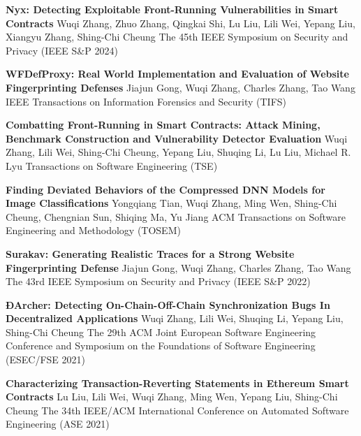 \documentclass[localFont,alternative]{documentMETADATA}
\begin{document}

\begin{keywords}
\end{keywords}


\begin{scholarship}
	{\textbf{Nyx: Detecting Exploitable Front-Running Vulnerabilities in Smart Contracts}}
	{Wuqi Zhang, Zhuo Zhang, Qingkai Shi, Lu Liu, Lili Wei, Yepang Liu, Xiangyu Zhang, Shing-Chi Cheung}
	\scholarshipentry{}
	{The 45th IEEE Symposium on Security and Privacy (IEEE S\&P 2024)}

	{\textbf{WFDefProxy: Real World Implementation and Evaluation of Website Fingerprinting Defenses}}
	{Jiajun Gong, Wuqi Zhang, Charles Zhang, Tao Wang}
	\scholarshipentry{}
	{IEEE Transactions on Information Forensics and Security (TIFS)}

	{\textbf{Combatting Front-Running in Smart Contracts: Attack Mining, Benchmark Construction and Vulnerability Detector Evaluation}}
	{Wuqi Zhang, Lili Wei, Shing-Chi Cheung, Yepang Liu, Shuqing Li, Lu Liu, Michael R. Lyu}
	\scholarshipentry{}
	{Transactions on Software Engineering (TSE)}

	{\textbf{Finding Deviated Behaviors of the Compressed DNN Models for Image Classifications}}
	{Yongqiang Tian, Wuqi Zhang, Ming Wen, Shing-Chi Cheung, Chengnian Sun, Shiqing Ma, Yu Jiang}
	\scholarshipentry{}
	{ACM Transactions on Software Engineering and Methodology (TOSEM)}

	{\textbf{Surakav: Generating Realistic Traces for a Strong Website Fingerprinting Defense}}
	{Jiajun Gong, Wuqi Zhang, Charles Zhang, Tao Wang}
	\scholarshipentry{}
	{The 43rd IEEE Symposium on Security and Privacy (IEEE S\&P 2022)}

	{\textbf{ÐArcher: Detecting On-Chain-Off-Chain Synchronization Bugs In Decentralized Applications}}
	{Wuqi Zhang, Lili Wei, Shuqing Li, Yepang Liu, Shing-Chi Cheung}
	\scholarshipentry{}
	{The 29th ACM Joint European Software Engineering Conference and Symposium on the Foundations of Software Engineering (ESEC/FSE 2021)}

	{\textbf{Characterizing Transaction-Reverting Statements in Ethereum Smart Contracts}}
	{Lu Liu, Lili Wei, Wuqi Zhang, Ming Wen, Yepang Liu, Shing-Chi Cheung}
	\scholarshipentry{}
	{The 34th IEEE/ACM International Conference on Automated Software Engineering (ASE 2021)}

\end{scholarship}
\end{document}
